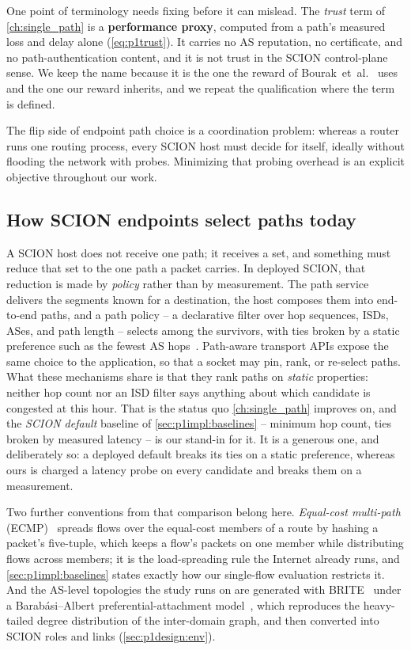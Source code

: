 One point of terminology needs fixing before it can mislead. The \emph{trust} term of
\cref{ch:single_path} is a \textbf{performance proxy}, computed from a path's measured loss and delay
alone (\cref{eq:p1trust}). It carries no AS reputation, no certificate, and no path-authentication
content, and it is not trust in the SCION control-plane sense. We keep the name because it is the one
the reward of Bourak~et~al.~\cite{Bourak2025} uses and the one our reward inherits, and we repeat the
qualification where the term is defined.

The flip side of endpoint path choice is a coordination problem: whereas a router runs one routing
process, every SCION host must decide for itself, ideally without flooding the network with probes.
Minimizing that probing overhead is an explicit objective throughout our work.

\subsection{How SCION endpoints select paths today}
\label{sec:background:pathsel}
A SCION host does not receive one path; it receives a set, and something must reduce that set to the
one path a packet carries. In deployed SCION, that reduction is made by \emph{policy} rather than by
measurement. The path service delivers the segments known for a destination, the host composes them
into end-to-end paths, and a path policy -- a declarative filter over hop sequences, ISDs, ASes, and
path length -- selects among the survivors, with ties broken by a static preference such as the fewest
AS hops~\cite{Perrig2017}. Path-aware transport APIs expose the same choice to the application, so that
a socket may pin, rank, or re-select paths. What these mechanisms share is that they rank paths on
\emph{static} properties: neither hop count nor an ISD filter says anything about which candidate is
congested at this hour. That is the status quo \cref{ch:single_path} improves on, and the
\emph{SCION default} baseline of \cref{sec:p1impl:baselines} -- minimum hop count, ties broken by
measured latency -- is our stand-in for it. It is a generous one, and deliberately so: a deployed
default breaks its ties on a static preference, whereas ours is charged a latency probe on every
candidate and breaks them on a measurement.

Two further conventions from that comparison belong here. \emph{Equal-cost multi-path}
(ECMP)~\cite{RFC2992} spreads flows over the equal-cost members of a route by hashing a packet's
five-tuple, which keeps a flow's packets on one member while distributing flows across members; it is
the load-spreading rule the Internet already runs, and \cref{sec:p1impl:baselines} states exactly how
our single-flow evaluation restricts it. And the AS-level topologies the study runs on are generated
with BRITE~\cite{Medina2001} under a Barab\'{a}si--Albert preferential-attachment
model~\cite{Barabasi1999}, which reproduces the heavy-tailed degree distribution of the inter-domain
graph, and then converted into SCION roles and links (\cref{sec:p1design:env}).

